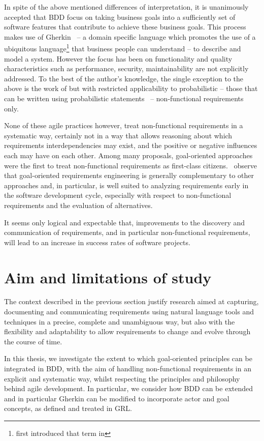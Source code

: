 \documentclass[dissertation]{softeng}
\begin{document}
In spite of the above mentioned differences of interpretation, it is unanimously accepted that BDD focus on taking business goals into a sufficiently set of software features that contribute to achieve these business goals. This process makes use of Gherkin~\citep{wynne2012cucumber} -- a domain specific language which promotes the use of a ubiquitous language\footnote{\citet{evans2004domain} first introduced that term in }  that business people can understand -- to describe and model a system. However the focus has been on functionality and quality characteristics such as performance, security, maintainability are not explicitly addressed. To the best of the author's knowledge, the single exception to the above is the work of \citet{barmi2011automated} but with restricted applicability to probabilistic -- those that can be written using probabilistic statements~\citep{grunske2008specification} -- non-functional requirements only.

None of these agile practices however, treat non-functional requirements in a systematic way, certainly not in a way that allows reasoning about which requirements interdependencies may exist, and the positive or negative influences each may have on each other. Among many proposals, goal-oriented approaches were the first to treat non-functional requirements as first-class citizens.~\citet{Mylopoulos:1999jh} observe that goal-oriented requirements engineering is generally complementary to other approaches and, in particular, is well suited to analyzing requirements early in the software development cycle, especially with respect to non-functional requirements and the evaluation of alternatives. 

It seems only logical and expectable that, improvements to the discovery and communication of requirements, and in particular non-functional requirements, will lead to an increase in success rates of software projects.

\section{Aim and limitations of study}
The context described in the previous section justify research aimed at capturing, documenting and communicating requirements using natural language tools and techniques in a precise, complete and unambiguous way, but also with the flexibility and adaptability to allow requirements to change and evolve through the course of time.

In this thesis, we investigate the extent to which goal-oriented principles can be integrated in BDD, with the aim of handling non-functional requirements in an explicit and systematic way, whilst respecting the principles and philosophy behind agile development. In particular, we consider how BDD can be extended and in particular Gherkin can be modified to incorporate actor and goal concepts, as defined and treated in GRL.
\end{document}
